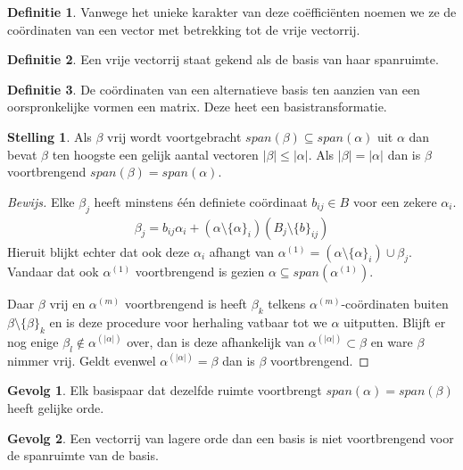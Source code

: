 \documentclass{amsart}
\theoremstyle{definition}
\newtheorem{thm}{Stelling}[section]
\newtheorem{dfn}{Definitie}[section]
\newtheorem{csq}{Gevolg}[section]
\newenvironment{bewijs}{\begin{proof}[Bewijs]}{\end{proof}}
\newcommand{\abs}[1]{\lvert#1\rvert}
\newcommand{\setsm}[1]{\{#1\}}
\newcommand{\without}[1]{\setminus\setsm#1}
\begin{document}
\begin{dfn}
	Vanwege het unieke karakter van deze coëfficiënten noemen we ze de coördinaten van een vector met betrekking tot de vrije vectorrij.
\end{dfn}

\begin{dfn}
	Een vrije vectorrij staat gekend als de basis van haar spanruimte.
\end{dfn}

\begin{dfn}
	De coördinaten van een alternatieve basis ten aanzien van een oorspronkelijke vormen een matrix.
	Deze heet een basistransformatie.
\end{dfn}

\begin{thm}
	Als $\beta$ vrij wordt voortgebracht $span(\beta) \subseteq span(\alpha)$ uit $\alpha$ dan bevat $\beta$ ten hoogste een gelijk aantal vectoren $\abs\beta \leq \abs\alpha$.
	Als $\abs\beta = \abs\alpha$ dan is $\beta$ voortbrengend $span(\beta) = span(\alpha)$. 
	\begin{bewijs}
		Elke $\beta_j$ heeft minstens één definiete coördinaat $b_{ij} \in B$ voor een zekere $\alpha_i$.
		\begin{align*}
			\beta_j = b_{ij}\alpha_i + (\alpha \without{\alpha_i})(B_j  \without{b_{ij}}) 
		\end{align*}
		Hieruit blijkt echter dat ook deze $\alpha_i$ afhangt van  $\alpha^{(1)} = (\alpha \without{\alpha_i}) \cup \beta_j$.
		Vandaar dat ook $\alpha^{(1)}$ voortbrengend is gezien $\alpha \subseteq span(\alpha^{(1)})$.

		Daar $\beta$ vrij en $\alpha^{(m)}$ voortbrengend is heeft $\beta_k$ telkens $\alpha^{(m)}$-coördinaten buiten $\beta \without{\beta_k}$ en is deze procedure voor herhaling vatbaar tot we $\alpha$ uitputten.
		Blijft er nog enige $\beta_l \notin \alpha^{(\abs{\alpha})}$ over, dan is deze afhankelijk van $\alpha^{(\abs\alpha)} \subset \beta$ en ware $\beta$ nimmer vrij.
		Geldt evenwel $\alpha^{(\abs{\alpha})} = \beta$ dan is $\beta$ voortbrengend.
	\end{bewijs}
\end{thm}

\begin{csq}
	Elk basispaar dat dezelfde ruimte voortbrengt $span(\alpha) = span(\beta)$ heeft gelijke orde.
\end{csq}

\begin{csq}
	Een vectorrij van lagere orde dan een basis is niet voortbrengend voor de spanruimte van de basis.
\end{csq}
\end{document}
